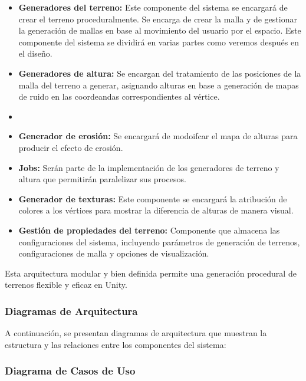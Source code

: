 \begin{itemize}
    \item \textbf{Generadores del terreno:} Este componente del sistema se encargará de crear el terreno proceduralmente. Se encarga de crear la malla y de gestionar la generación de mallas en base al movimiento del usuario por el espacio. Este componente del sistema se dividirá en varias partes como veremos después en el diseño.

    \item \textbf{Generadores de altura:} Se encargan del tratamiento de las posiciones de la malla del terreno a generar, asignando alturas en base a generación de mapas de ruido en las coordeandas correspondientes al vértice.
    \item 
    \item \textbf{Generador de erosión:} Se encargará de modoifcar el mapa de alturas para producir el efecto de erosión.
    
    \item \textbf{Jobs:} Serán parte de la implementación de los generadores de terreno y altura que permitirán paralelizar sus procesos.

    \item \textbf{Generador de texturas:} Este componente se encargará la atribución de colores a los vértices para mostrar la diferencia de alturas de manera visual.    
        
    \item \textbf{Gestión de propiedades del terreno:} Componente que almacena las configuraciones del sistema, incluyendo parámetros de generación de terrenos, configuraciones de malla y opciones de visualización.
\end{itemize}

Esta arquitectura modular y bien definida permite una generación procedural de terrenos flexible y eficaz en Unity.

\subsubsection{Diagramas de Arquitectura}
A continuación, se presentan diagramas de arquitectura que muestran la estructura y las relaciones entre los componentes del sistema:

\subsubsection{Diagrama de Casos de Uso}

